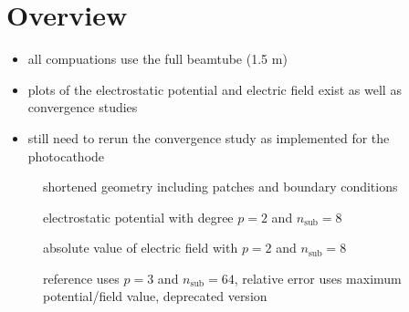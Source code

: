 \section{Overview}
\begin{itemize}
  \item all compuations use the full beamtube (1.5 m)
  \item plots of the electrostatic potential and electric field exist as well as convergence studies
  \item still need to rerun the convergence study as implemented for the photocathode
\end{itemize}

\begin{center}
\begin{figure}[H]
  
  \caption{shortened geometry including patches and boundary conditions}
\end{figure}
\end{center}

\begin{center}
\begin{figure}[H]
  
  \caption{electrostatic potential with degree $p=2$ and $n_\mathrm{sub}=8$}
\end{figure}
\end{center}

\begin{center}
\begin{figure}[H]
  
  \caption{absolute value of electric field with $p=2$ and $n_\mathrm{sub}=8$}
\end{figure}
\end{center}

\begin{figure}[H]
  \hspace{-2.5cm}
  
  \caption{reference uses $p=3$ and $n_\mathrm{sub}=64$, relative error uses maximum potential/field value, deprecated version}
\end{figure}
